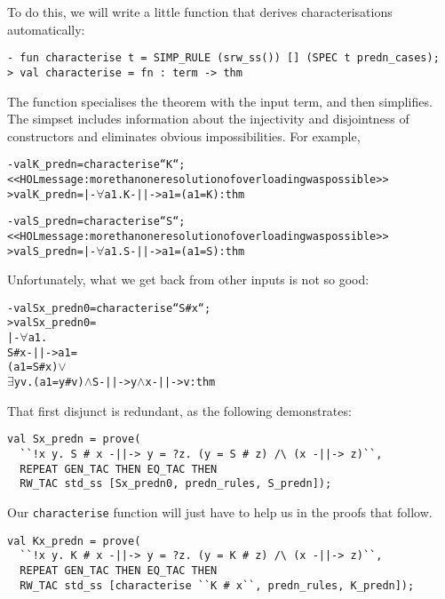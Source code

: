 To do this, we will write a little function that derives
characterisations automatically:
\begin{session}
\begin{verbatim}
- fun characterise t = SIMP_RULE (srw_ss()) [] (SPEC t predn_cases);
> val characterise = fn : term -> thm
\end{verbatim}
\end{session}
The  function specialises the theorem
 with the input term, and then simplifies.  The
 simpset includes information about the injectivity and
disjointness of constructors and eliminates obvious impossibilities.
For example,
\begin{session}
\begin{alltt}
- val K_predn = characterise ``K``;
<<HOL message: more than one resolution of overloading was possible>>
> val K_predn = |- \(\forall\)a1. K -||-> a1 = (a1 = K) : thm

- val S_predn = characterise ``S``;
<<HOL message: more than one resolution of overloading was possible>>
> val S_predn = |- \(\forall\)a1. S -||-> a1 = (a1 = S) : thm
\end{alltt}
\end{session}
Unfortunately, what we get back from other inputs is not so good:
\begin{session}
\begin{alltt}
- val Sx_predn0 = characterise ``S # x``;
> val Sx_predn0 =
    |- \(\forall\)a1.
         S # x -||-> a1 =
         (a1 = S # x) \(\lor\)
         \(\exists\)y v. (a1 = y # v) \(\land\) S -||-> y \(\land\) x -||-> v : thm
\end{alltt}
\end{session}
That first disjunct is redundant, as the following demonstrates:
\begin{session}
\begin{verbatim}
val Sx_predn = prove(
  ``!x y. S # x -||-> y = ?z. (y = S # z) /\ (x -||-> z)``,
  REPEAT GEN_TAC THEN EQ_TAC THEN
  RW_TAC std_ss [Sx_predn0, predn_rules, S_predn]);
\end{verbatim}
\end{session}
Our \texttt{characterise} function will just have to help us in the
proofs that follow.
\begin{session}
\begin{verbatim}
val Kx_predn = prove(
  ``!x y. K # x -||-> y = ?z. (y = K # z) /\ (x -||-> z)``,
  REPEAT GEN_TAC THEN EQ_TAC THEN
  RW_TAC std_ss [characterise ``K # x``, predn_rules, K_predn]);
\end{verbatim}
\end{session}
